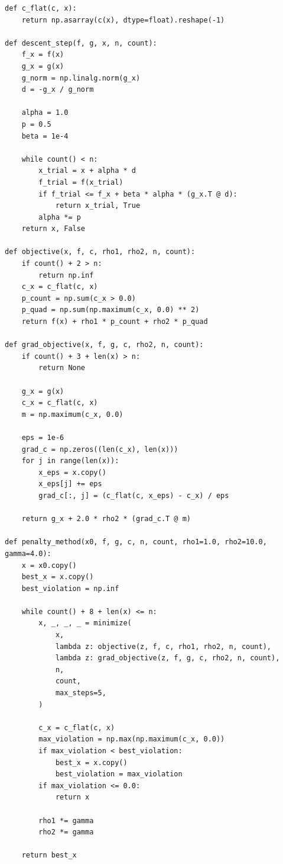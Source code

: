 \begin{lstlisting}
def c_flat(c, x):
    return np.asarray(c(x), dtype=float).reshape(-1)

def descent_step(f, g, x, n, count):
    f_x = f(x)
    g_x = g(x)
    g_norm = np.linalg.norm(g_x)
    d = -g_x / g_norm

    alpha = 1.0
    p = 0.5
    beta = 1e-4

    while count() < n:
        x_trial = x + alpha * d
        f_trial = f(x_trial)
        if f_trial <= f_x + beta * alpha * (g_x.T @ d):
            return x_trial, True
        alpha *= p
    return x, False

def objective(x, f, c, rho1, rho2, n, count):
    if count() + 2 > n:
        return np.inf
    c_x = c_flat(c, x)
    p_count = np.sum(c_x > 0.0)
    p_quad = np.sum(np.maximum(c_x, 0.0) ** 2)
    return f(x) + rho1 * p_count + rho2 * p_quad

def grad_objective(x, f, g, c, rho2, n, count):
    if count() + 3 + len(x) > n:
        return None

    g_x = g(x)
    c_x = c_flat(c, x)
    m = np.maximum(c_x, 0.0)

    eps = 1e-6
    grad_c = np.zeros((len(c_x), len(x)))
    for j in range(len(x)):
        x_eps = x.copy()
        x_eps[j] += eps
        grad_c[:, j] = (c_flat(c, x_eps) - c_x) / eps

    return g_x + 2.0 * rho2 * (grad_c.T @ m)

def penalty_method(x0, f, g, c, n, count, rho1=1.0, rho2=10.0, gamma=4.0):
    x = x0.copy()
    best_x = x.copy()
    best_violation = np.inf

    while count() + 8 + len(x) <= n:
        x, _, _, _ = minimize(
            x,
            lambda z: objective(z, f, c, rho1, rho2, n, count),
            lambda z: grad_objective(z, f, g, c, rho2, n, count),
            n,
            count,
            max_steps=5,
        )

        c_x = c_flat(c, x)
        max_violation = np.max(np.maximum(c_x, 0.0))
        if max_violation < best_violation:
            best_x = x.copy()
            best_violation = max_violation
        if max_violation <= 0.0:
            return x

        rho1 *= gamma
        rho2 *= gamma

    return best_x
\end{lstlisting}
